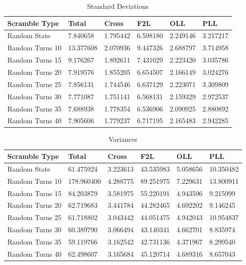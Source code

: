 \documentclass[12pt,letterpaper]{article}
\numberwithin{equation}{section}
\begin{document}
\begin{table}[H]
\centering
\caption{Standard Deviations}
\begin{tabular}{|p{4cm}|p{2cm}|p{2cm}|p{2cm}|p{2cm}|p{2cm}|}
\hline
\textbf{Scramble Type} & \textbf{Total} & \textbf{Cross} & \textbf{F2L} & \textbf{OLL} & \textbf{PLL} \\ \hline
Random State & 7.840658 & 1.795442 & 6.598180 & 2.249146 & 3.217217 \\ \hdashline
Random Turns 10 & 13.377608 & 2.070936 & 9.447326 & 2.688797 & 3.714958 \\ 
Random Turns 15 & 9.176267 & 1.892611 & 7.431029 & 2.223420 & 3.035786 \\ 
Random Turns 20 & 7.919576 & 1.855205 & 6.654507 & 2.166149 & 3.024276 \\ 
Random Turns 25 & 7.856131 & 1.744546 & 6.637129 & 2.223071 & 3.309809 \\ 
Random Turns 30 & 7.771087 & 1.751141 & 6.568131 & 2.159329 & 2.972537 \\ 
Random Turns 35 & 7.688938 & 1.778354 & 6.536906 & 2.090925 & 2.880892 \\ 
Random Turns 40 & 7.905606 & 1.779237 & 6.717195 & 2.165483 & 2.942285 \\ \hline
\end{tabular}
\end{table}

\begin{table}[H]
\centering
\caption{Variances}
\begin{tabular}{|p{4cm}|p{2cm}|p{2cm}|p{2cm}|p{2cm}|p{2cm}|}
\hline
\textbf{Scramble Type} & \textbf{Total} & \textbf{Cross} & \textbf{F2L} & \textbf{OLL} & \textbf{PLL} \\ \hline
Random State & 61.475924 & 3.223613 & 43.535983 & 5.058656 & 10.350482 \\ \hdashline
Random Turns 10 & 178.960400 & 4.288775 & 89.251975 & 7.229631 & 13.800911 \\ 
Random Turns 15 & 84.203879 & 3.581975 & 55.220191 & 4.943596 & 9.215999 \\ 
Random Turns 20 & 62.719683 & 3.441784 & 44.282465 & 4.692202 & 9.146245 \\ 
Random Turns 25 & 61.718802 & 3.043442 & 44.051475 & 4.942043 & 10.954837 \\ 
Random Turns 30 & 60.389790 & 3.066494 & 43.140341 & 4.662701 & 8.835974 \\ 
Random Turns 35 & 59.119766 & 3.162542 & 42.731136 & 4.371967 & 8.299540 \\ 
Random Turns 40 & 62.498607 & 3.165684 & 45.120714 & 4.689316 & 8.657043 \\ \hline
\end{tabular}
\end{table}
\end{document}
